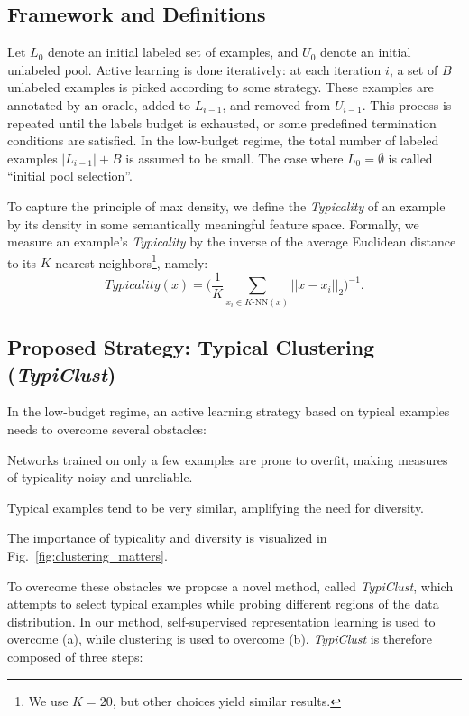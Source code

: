 \documentclass{article}
\begin{document}
\subsection{Framework and Definitions}

Let $L_0$ denote an initial labeled set of examples, and $U_0$ denote an initial unlabeled pool. Active learning is done iteratively: at each iteration $i$, a set of $B$ unlabeled examples is picked according to some strategy. These examples are annotated by an oracle, added to $L_{i-1}$, and removed from $U_{i-1}$. This process is repeated until the labels budget is exhausted, or some predefined termination conditions are satisfied. In the low-budget regime, the total number of labeled examples $\vert L_{i-1}\vert+B$ is assumed to be small. The case where $L_0=\emptyset$ is called ``initial pool selection''.




To capture the principle of max density, we define the \emph{Typicality} of an example by its density in some semantically meaningful feature space. Formally, we measure an example's \emph{Typicality} by the inverse of the average Euclidean distance to its $K$ nearest neighbors\footnote{We use $K=20$, but other choices yield similar results.}, namely: \begingroup\abovedisplayskip=4pt\belowdisplayskip=4pt
\begin{equation}
\label{eq:density}
    Typicality(x)=\bigg(\frac{1}{K}\sum_{x_i\in K\text{-NN}(x)}||x-x_i||_2\bigg)^{-1}.
\end{equation}
\endgroup

\subsection{Proposed Strategy: Typical Clustering (\emph{TypiClust})}

In the low-budget regime, an active learning strategy based on typical examples needs to overcome several obstacles: 
\begin{inparaenum}[(a)]
    \item Networks trained on only a few examples are prone to overfit, making measures of typicality noisy and unreliable.
    \item Typical examples tend to be very similar, amplifying the need for diversity.
\end{inparaenum}
The importance of typicality and diversity is visualized in Fig.~\ref{fig:clustering_matters}.

To overcome these obstacles we propose a novel method, called \emph{TypiClust}, which attempts to select typical examples while probing different regions of the data distribution. In our method, self-supervised representation learning is used to overcome (a), while clustering is used to overcome (b). \emph{TypiClust} is therefore composed of three steps:
\end{document}
